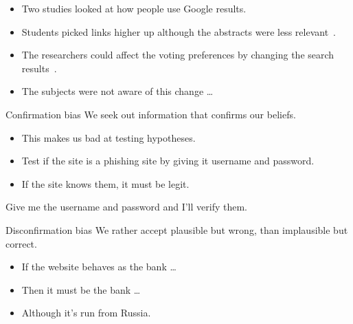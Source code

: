 \begin{frame}
  \begin{example}
    \begin{itemize}
      \item Two studies looked at how people use Google results.

      \item Students picked links higher up although the abstracts were less 
        relevant~\cite{Pan2007igw}.

      \item The researchers could affect the voting preferences by changing the 
        search results~\cite{Epstein2013dar}.

      \item The subjects were not aware of this change \dots
    \end{itemize}
  \end{example}
\end{frame}

\begin{frame}
  \begin{block}{Confirmation bias}
    We seek out information that confirms our beliefs.
  \end{block}

  \pause

  \begin{example}
    \begin{itemize}
      \item This makes us bad at testing hypotheses.
      \item Test if the site is a phishing site by giving it username and 
        password.
      \item If the site knows them, it must be legit.
    \end{itemize}
  \end{example}

  \pause

  \begin{remark}
    Give me the username and password and I'll verify them.
  \end{remark}
\end{frame}

\begin{frame}
  \begin{block}{Disconfirmation bias}
    We rather accept plausible but wrong, than implausible but correct.
  \end{block}

  \pause

  \begin{example}
    \begin{itemize}
      \item If the website behaves as the bank \dots
      \item Then it must be the bank \dots
      \item Although it's run from Russia.
    \end{itemize}
  \end{example}
\end{frame}


